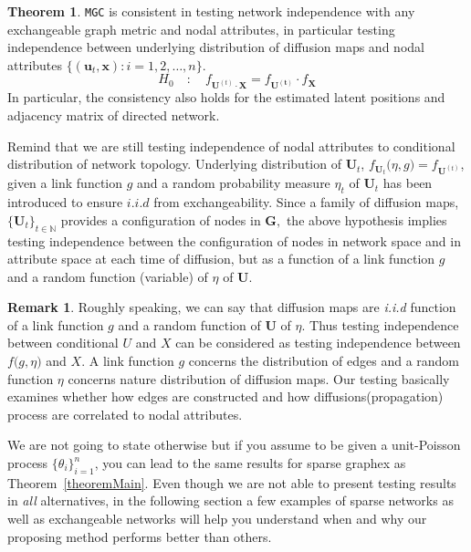\documentclass[12pt]{article}
\theoremstyle{definition}
\newtheorem{theorem}{Theorem}[section]
\newtheorem{remark}{Remark}
\begin{document}
\begin{theorem}
	\label{theorem2}
	\texttt{MGC} is consistent in testing network independence with any exchangeable graph metric and nodal attributes, in particular testing independence between underlying distribution of diffusion maps and nodal attributes $\{ ( \mathbf{u}_{t},  \mathbf{x}  ) : i =1,2, \ldots , n \}$.
	\begin{equation}
	H_{0}  \quad : \quad f_{\mathbf{U}^{(t)} \cdot \mathbf{X}  }  = f_{\mathbf{U^{(t)}}} \cdot f_{\mathbf{X}}
	\label{eq:hypothesis}
	\end{equation}
	 In particular, the consistency also holds for the estimated latent positions and adjacency matrix of directed network.
\end{theorem}
		
Remind that we are still testing independence of nodal attributes to conditional distribution of network topology. Underlying distribution of $\mathbf{U}_{t}$, $f_{\mathbf{U}_t} \big( \eta, g \big) = f_{\mathbf{U}^{(t)} }$, given a link function $g$ and a random probability measure $\eta_{t}$ of $\mathbf{U}_t$ has been introduced to ensure $\textit{i.i.d}$ from exchangeability. Since a family of diffusion maps, $\{ \mathbf{U}_{t} \}_{t \in \mathbb{N}}$ provides a configuration of nodes in $\mathbf{G},$ the above hypothesis implies testing independence between the configuration of nodes in network space and in attribute space at each time of diffusion, but as a function of a link function $g$ and a random function (variable) of $\eta$ of $\mathbf{U}$.	
\begin{remark}
	Roughly speaking, we can say that diffusion maps are \textit{i.i.d} function of a link function $g$ and a random function of $\mathbf{U}$ of $\eta$. Thus testing independence between conditional $U$ and $X$ can be considered as testing independence between $f \big( g, \eta \big)$ and $X$. A link function $g$ concerns the distribution of edges and a random function $\eta$ concerns nature distribution of diffusion maps. Our testing basically examines whether how edges are constructed and how diffusions(propagation) process are correlated to nodal attributes.  
\end{remark}

We are not going to state otherwise but if you assume to be given a unit-Poisson process $\{ \theta_{i} \}_{i=1}^{n}$, you can lead to the same results for sparse graphex as Theorem~\ref{theoremMain}. Even though we are not able to present testing results in \textit{all} alternatives, in the following section a few examples of sparse networks as well as exchangeable networks will help you understand when and why our proposing method performs better than others. 
\end{document}
